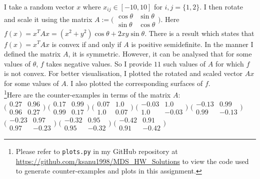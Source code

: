 \documentclass{article}
\begin{document}
\begin{flushleft}
 I take a random vector $x$ where $x_{ij}\in[-10,10]$ for $i,j=\{1,2\}$. I then rotate and scale it using the matrix $A:=\Big(\begin{matrix}\cos\theta & \sin\theta \\ \sin\theta & \cos\theta\end{matrix}\Big)$. Here $f(x)=x^{T}Ax=(x^{2}+y^{2})\cos\theta+2xy\sin\theta$. There is a result which states that $f(x)=x^{T}Ax$ is convex if and only if $A$ is positive semidefinite. In the manner I defined the matrix $A$, it is symmetric. However, it can be analysed that for some values of $\theta$, $f$ takes negative values. So I provide $11$ such values of $A$ for which $f$ is not convex. For better visualisation, I plotted the rotated and scaled vector $Ax$ for some values of $A$. I also plotted the corresponding surfaces of $f$.\\
 \footnote{Please refer to \texttt{plots.py} in my GitHub repository at \href{https://github.com/ksanu1998/MDS_HW_Solutions}{https://github.com/ksanu1998/MDS\_HW\_Solutions} to view the code used to generate counter-examples and plots in this assignment.}Here are the counter-examples in terms of the matrix $A$:\\
 $\Big(\begin{matrix}0.27 & 0.96 \\ 0.96 & 0.27\end{matrix}\Big)$
 $\Big(\begin{matrix}0.17 & 0.99 \\ 0.99 & 0.17\end{matrix}\Big)$
 $\Big(\begin{matrix}0.07 & 1.0 \\ 1.0 & 0.07\end{matrix}\Big)$
 $\Big(\begin{matrix}-0.03 & 1.0 \\ 1.0 & -0.03\end{matrix}\Big)$
 $\Big(\begin{matrix}-0.13 & 0.99 \\ 0.99 & -0.13\end{matrix}\Big)$
 $\Big(\begin{matrix}-0.23 & 0.97 \\ 0.97 & -0.23\end{matrix}\Big)$
 $\Big(\begin{matrix}-0.32 & 0.95 \\ 0.95 & -0.32\end{matrix}\Big)$
 $\Big(\begin{matrix}-0.42 & 0.91 \\ 0.91 & -0.42\end{matrix}\Big)$

\end{flushleft}
\end{document}
